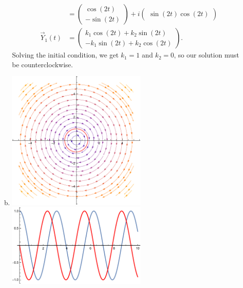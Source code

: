 \documentclass[10pt]{mypackage}
\begin{document}
\begin{enumerate}[(a)]
\begin{align*}
                 &= \begin{pmatrix}\cos\left(2t\right)\\-\sin\left(2t\right)\end{pmatrix} + i\begin{pmatrix}\sin\left(2t\right)\cos\left(2t\right)\end{pmatrix}\\
      \vec{Y}_1(t) &= \begin{pmatrix}k_1\cos\left(2t\right) + k_2\sin\left(2t\right) \\ -k_1\sin\left(2t\right) + k_2\cos\left(2t\right)\end{pmatrix}.
    \end{align*}
    Solving the initial condition, we get $k_1 = 1$ and $k_2 = 0$, so our solution must be counterclockwise.
  \item\hfill
    \begin{center}
      \includegraphics[width=7cm]{images/3_4_3e1.pdf} \includegraphics[width=7cm]{images/3_4_3e2.pdf}
    \end{center}
\end{enumerate}
\end{document}
